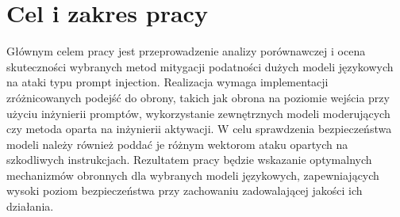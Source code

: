 \section{Cel i zakres pracy}

Głównym celem pracy jest przeprowadzenie analizy porównawczej i ocena skuteczności wybranych metod mitygacji podatności dużych modeli językowych na ataki typu prompt injection.
Realizacja wymaga implementacji zróżnicowanych podejść do obrony, takich jak obrona na poziomie wejścia przy użyciu inżynierii promptów, wykorzystanie zewnętrznych modeli moderujących czy metoda oparta na inżynierii aktywacji.
W celu sprawdzenia bezpieczeństwa modeli należy również poddać je różnym wektorom ataku opartych na szkodliwych instrukcjach.
Rezultatem pracy będzie wskazanie optymalnych mechanizmów obronnych dla wybranych modeli językowych, zapewniających wysoki poziom bezpieczeństwa przy zachowaniu zadowalającej jakości ich działania.